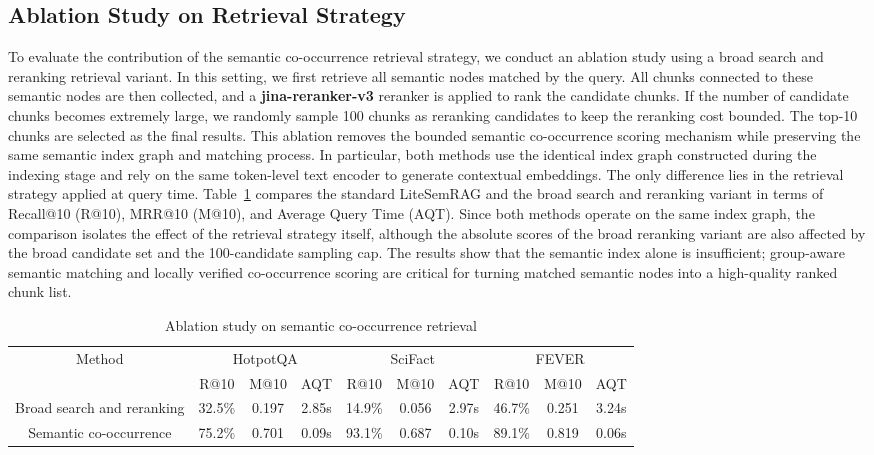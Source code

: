 \documentclass[conference]{IEEEtran}
\begin{document}
\subsection{Ablation Study on Retrieval Strategy}
To evaluate the contribution of the semantic co-occurrence retrieval strategy, we conduct an ablation study using a broad search and reranking retrieval variant. In this setting, we first retrieve all semantic nodes matched by the query. All chunks connected to these semantic nodes are then collected, and a \textbf{jina-reranker-v3} reranker is applied to rank the candidate chunks. If the number of candidate chunks becomes extremely large, we randomly sample 100 chunks as reranking candidates to keep the reranking cost bounded. The top-10 chunks are selected as the final results. This ablation removes the bounded semantic co-occurrence scoring mechanism while preserving the same semantic index graph and matching process. In particular, both methods use the identical index graph constructed during the indexing stage and rely on the same token-level text encoder to generate contextual embeddings. The only difference lies in the retrieval strategy applied at query time. Table~\ref{tab:ablation_results} compares the standard LiteSemRAG and the broad search and reranking variant in terms of Recall@10 (R@10), MRR@10 (M@10), and Average Query Time (AQT). Since both methods operate on the same index graph, the comparison isolates the effect of the retrieval strategy itself, although the absolute scores of the broad reranking variant are also affected by the broad candidate set and the 100-candidate sampling cap. The results show that the semantic index alone is insufficient; group-aware semantic matching and locally verified co-occurrence scoring are critical for turning matched semantic nodes into a high-quality ranked chunk list.

\begin{table}[t]
\centering
\small
\setlength{\tabcolsep}{5pt}
\caption{Ablation study on semantic co-occurrence retrieval}
\label{tab:ablation_results}
\begin{tabular}{cccccccccc}
\hline
\multirow{2}{*}{Method}  & \multicolumn{3}{c}{HotpotQA} & \multicolumn{3}{c}{SciFact} & \multicolumn{3}{c}{FEVER} \\ \cline{2-10}
                         & R@10     & M@10    & AQT     & R@10     & M@10    & AQT    & R@10    & M@10   & AQT    \\ \hline
Broad search and reranking & 32.5\%   & 0.197   & 2.85s   & 14.9\%   & 0.056   & 2.97s  & 46.7\%  & 0.251  & 3.24s  \\
Semantic co-occurrence  & 75.2\%   & 0.701   & 0.09s   & 93.1\%   & 0.687   & 0.10s  & 89.1\%  & 0.819  & 0.06s  \\ \hline
\end{tabular}
\end{table}
\end{document}
